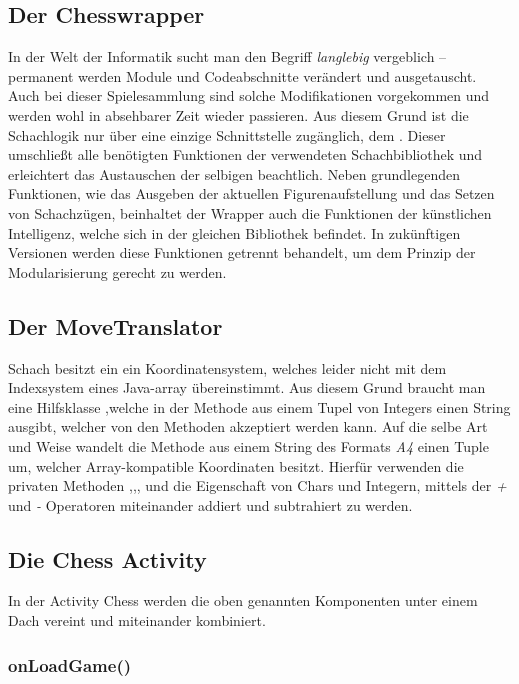 \subsection{Der Chesswrapper}

In der Welt der Informatik sucht man den Begriff \emph{langlebig} vergeblich --
permanent werden Module und Codeabschnitte verändert und ausgetauscht. Auch bei
dieser Spielesammlung sind solche Modifikationen vorgekommen und werden wohl in
absehbarer Zeit wieder passieren. Aus diesem Grund ist die Schachlogik nur über
eine einzige Schnittstelle zugänglich, dem . Dieser
umschließt alle benötigten Funktionen der verwendeten Schachbibliothek und
erleichtert das Austauschen der selbigen beachtlich. Neben grundlegenden
Funktionen, wie das Ausgeben der aktuellen Figurenaufstellung und das Setzen
von Schachzügen, beinhaltet der Wrapper auch die Funktionen der künstlichen
Intelligenz, welche sich in der gleichen Bibliothek befindet. In zukünftigen
Versionen werden diese Funktionen getrennt behandelt, um dem Prinzip der 
Modularisierung gerecht zu werden.

\subsection{Der MoveTranslator}
Schach besitzt ein ein Koordinatensystem, welches leider nicht mit dem 
Indexsystem eines Java-array übereinstimmt. Aus diesem Grund braucht man eine 
Hilfsklasse ,welche in der Methode  aus 
einem Tupel von Integers einen String ausgibt, welcher von den 
 Methoden akzeptiert werden kann. Auf die selbe Art und Weise 
wandelt die Methode  aus einem String des Formats \emph{A4} 
einen Tuple um, welcher Array-kompatible Koordinaten besitzt. Hierfür verwenden 
die privaten Methoden ,,, und 
 die Eigenschaft von Chars und Integern, mittels der \emph{+}
und \emph{-} Operatoren miteinander addiert und subtrahiert zu werden.


\subsection{Die Chess Activity}

In der Activity Chess werden die oben genannten Komponenten unter einem Dach 
vereint und miteinander kombiniert.

\subsubsection{onLoadGame()}

